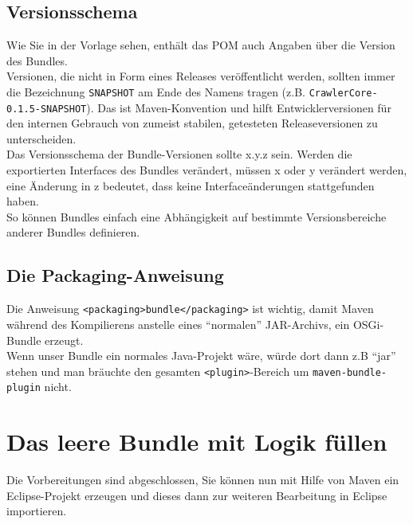 \documentclass[a4paper,12pt]{scrartcl}
\begin{document}
\subsection{Versionsschema}
Wie Sie in der Vorlage sehen, enthält das POM auch Angaben über die Version des Bundles.\\
Versionen, die nicht in Form eines Releases veröffentlicht werden, sollten immer die Bezeichnung \lstinline[breaklines=false, basicstyle=\itshape]|SNAPSHOT| am Ende des Namens tragen (z.B. \lstinline[breaklines=false, basicstyle=\itshape]|CrawlerCore-0.1.5-SNAPSHOT|). Das ist Maven-Konvention und hilft Entwicklerversionen für den internen Gebrauch von zumeist stabilen, getesteten Releaseversionen zu unterscheiden.\\
Das Versionsschema der Bundle-Versionen sollte x.y.z sein. Werden die exportierten Interfaces des Bundles verändert, müssen x oder y verändert werden, eine Änderung in z bedeutet, dass keine Interfaceänderungen stattgefunden haben.\\
So können Bundles einfach eine Abhängigkeit auf bestimmte Versionsbereiche anderer Bundles definieren.

\subsection{Die Packaging-Anweisung}
Die Anweisung \lstinline[breaklines=false, basicstyle=\itshape]|<packaging>bundle</packaging>| ist wichtig, damit Maven während des Kompilierens anstelle eines "`normalen"' JAR-Archivs, ein OSGi-Bundle erzeugt.\\
Wenn unser Bundle ein normales Java-Projekt wäre, würde dort dann z.B "`jar"' stehen und man bräuchte den gesamten \lstinline[breaklines=false, basicstyle=\itshape]|<plugin>|-Bereich um \lstinline[breaklines=false, basicstyle=\itshape]|maven-bundle-plugin| nicht.

\section{Das leere Bundle mit Logik füllen}

Die Vorbereitungen sind abgeschlossen, Sie können nun mit Hilfe von Maven ein Eclipse-Projekt erzeugen und dieses dann zur weiteren Bearbeitung in Eclipse importieren.\\
\end{document}
